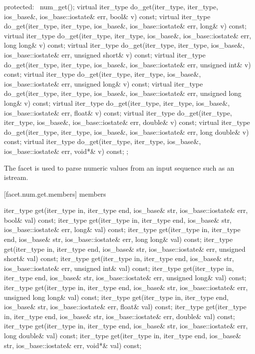 \begin{codeblock}
{{  protected:
    ~num_get();
    virtual iter_type do_get(iter_type, iter_type, ios_base&,
                             ios_base::iostate& err, bool& v) const;
    virtual iter_type do_get(iter_type, iter_type, ios_base&,
                             ios_base::iostate& err, long& v) const;
    virtual iter_type do_get(iter_type, iter_type, ios_base&,
                             ios_base::iostate& err, long long& v) const;
    virtual iter_type do_get(iter_type, iter_type, ios_base&,
                             ios_base::iostate& err, unsigned short& v) const;
    virtual iter_type do_get(iter_type, iter_type, ios_base&,
                             ios_base::iostate& err, unsigned int& v) const;
    virtual iter_type do_get(iter_type, iter_type, ios_base&,
                             ios_base::iostate& err, unsigned long& v) const;
    virtual iter_type do_get(iter_type, iter_type, ios_base&,
                             ios_base::iostate& err, unsigned long long& v) const;
    virtual iter_type do_get(iter_type, iter_type, ios_base&,
                             ios_base::iostate& err, float& v) const;
    virtual iter_type do_get(iter_type, iter_type, ios_base&,
                             ios_base::iostate& err, double& v) const;
    virtual iter_type do_get(iter_type, iter_type, ios_base&,
                             ios_base::iostate& err, long double& v) const;
    virtual iter_type do_get(iter_type, iter_type, ios_base&,
                             ios_base::iostate& err, void*& v) const;
  };
}
\end{codeblock}
 
\pnum
The facet
is used to parse numeric values from an input sequence such as an istream.

[facet.num.get.members]{ members}

%
%
\begin{itemdecl}
iter_type get(iter_type in, iter_type end, ios_base& str,
  ios_base::iostate& err, bool& val) const;
iter_type get(iter_type in, iter_type end, ios_base& str,
  ios_base::iostate& err, long& val) const;
iter_type get(iter_type in, iter_type end, ios_base& str,
  ios_base::iostate& err, long long& val) const;
iter_type get(iter_type in, iter_type end, ios_base& str,
  ios_base::iostate& err, unsigned short& val) const;
iter_type get(iter_type in, iter_type end, ios_base& str,
  ios_base::iostate& err, unsigned int& val) const;
iter_type get(iter_type in, iter_type end, ios_base& str,
  ios_base::iostate& err, unsigned long& val) const;
iter_type get(iter_type in, iter_type end, ios_base& str,
  ios_base::iostate& err, unsigned long long& val) const;
iter_type get(iter_type in, iter_type end, ios_base& str,
  ios_base::iostate& err, float& val) const;
iter_type get(iter_type in, iter_type end, ios_base& str,
  ios_base::iostate& err, double& val) const;
iter_type get(iter_type in, iter_type end, ios_base& str,
  ios_base::iostate& err, long double& val) const;
iter_type get(iter_type in, iter_type end, ios_base& str,
  ios_base::iostate& err, void*& val) const;
\end{itemdecl}

